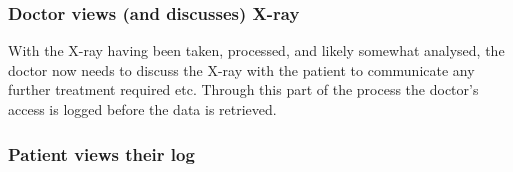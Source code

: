 

\subsubsection{Doctor views (and discusses) X-ray}

With the X-ray having been taken, processed, and likely somewhat analysed, the doctor now needs to discuss the X-ray with the patient to communicate any further treatment required etc. Through this part of the process the doctor's access is logged before the data is retrieved.



\subsubsection{Patient views their log}




